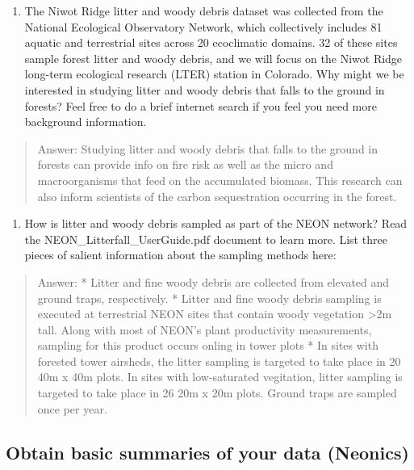 \documentclass[]{article}
\providecommand{\tightlist}{%
  \setlength{\itemsep}{0pt}\setlength{\parskip}{0pt}}
\begin{document}
\begin{enumerate}
\def\labelenumi{\arabic{enumi}.}
\setcounter{enumi}{2}
\tightlist
\item
  The Niwot Ridge litter and woody debris dataset was collected from the
  National Ecological Observatory Network, which collectively includes
  81 aquatic and terrestrial sites across 20 ecoclimatic domains. 32 of
  these sites sample forest litter and woody debris, and we will focus
  on the Niwot Ridge long-term ecological research (LTER) station in
  Colorado. Why might we be interested in studying litter and woody
  debris that falls to the ground in forests? Feel free to do a brief
  internet search if you feel you need more background information.
\end{enumerate}

\begin{quote}
Answer: Studying litter and woody debris that falls to the ground in
forests can provide info on fire risk as well as the micro and
macroorganisms that feed on the accumulated biomass. This research can
also inform scientists of the carbon sequestration occurring in the
forest.
\end{quote}

\begin{enumerate}
\def\labelenumi{\arabic{enumi}.}
\setcounter{enumi}{3}
\tightlist
\item
  How is litter and woody debris sampled as part of the NEON network?
  Read the NEON\_Litterfall\_UserGuide.pdf document to learn more. List
  three pieces of salient information about the sampling methods here:
\end{enumerate}

\begin{quote}
Answer: * Litter and fine woody debris are collected from elevated and
ground traps, respectively. * Litter and fine woody debris sampling is
executed at terrestrial NEON sites that contain woody vegetation
\textgreater{}2m tall. Along with most of NEON's plant productivity
measurements, sampling for this product occurs onling in tower plots *
In sites with forested tower airsheds, the litter sampling is targeted
to take place in 20 40m x 40m plots. In sites with low-saturated
vegitation, litter sampling is targeted to take place in 26 20m x 20m
plots. Ground traps are sampled once per year.
\end{quote}

\subsection{Obtain basic summaries of your data
(Neonics)}\label{obtain-basic-summaries-of-your-data-neonics}
\end{document}
